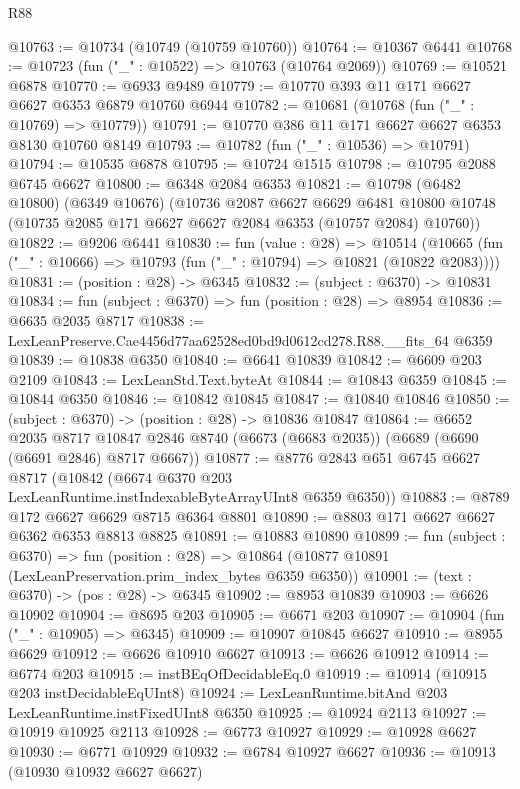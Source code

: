 \begin{lexlean}{R88}
\begin{coremodule}
@10763 := @10734 (@10749 (@10759 @10760))
@10764 := @10367 @6441
@10768 := @10723 (fun ("_" : @10522) => @10763 (@10764 @2069))
@10769 := @10521 @6878
@10770 := @6933 @9489
@10779 := @10770 @393 @11 @171 @6627 @6627 @6353 @6879 @10760 @6944
@10782 := @10681 (@10768 (fun ("_" : @10769) => @10779))
@10791 := @10770 @386 @11 @171 @6627 @6627 @6353 @8130 @10760 @8149
@10793 := @10782 (fun ("_" : @10536) => @10791)
@10794 := @10535 @6878
@10795 := @10724 @1515
@10798 := @10795 @2088 @6745 @6627
@10800 := @6348 @2084 @6353
@10821 := @10798
    (@6482 @10800)
    (@6349 @10676)
    (@10736
      @2087
      @6627
      @6629
      @6481
      @10800
      @10748
      (@10735 @2085 @171 @6627 @6627 @2084 @6353 (@10757 @2084) @10760))
@10822 := @9206 @6441
@10830 := fun (value : @28) =>
  @10514 (@10665 (fun ("_" : @10666) => @10793 (fun ("_" : @10794) => @10821 (@10822 @2083))))
@10831 := (position : @28) -> @6345
@10832 := (subject : @6370) -> @10831
@10834 := fun (subject : @6370) => fun (position : @28) => @8954
@10836 := @6635 @2035 @8717
@10838 := LexLeanPreserve.Cae4456d77aa62528ed0bd9d0612cd278.R88.__fits_64 @6359
@10839 := @10838 @6350
@10840 := @6641 @10839
@10842 := @6609 @203 @2109
@10843 := LexLeanStd.Text.byteAt
@10844 := @10843 @6359
@10845 := @10844 @6350
@10846 := @10842 @10845
@10847 := @10840 @10846
@10850 := (subject : @6370) -> (position : @28) -> @10836 @10847
@10864 := @6652
    @2035
    @8717
    @10847
    @2846
    @8740
    (@6673 (@6683 @2035))
    (@6689 (@6690 (@6691 @2846) @8717 @6667))
@10877 := @8776
    @2843
    @651
    @6745
    @6627
    @8717
    (@10842 (@6674 @6370 @203 LexLeanRuntime.instIndexableByteArrayUInt8 @6359 @6350))
@10883 := @8789 @172 @6627 @6629 @8715 @6364 @8801
@10890 := @8803 @171 @6627 @6627 @6362 @6353 @8813 @8825
@10891 := @10883 @10890
@10899 := fun (subject : @6370) =>
  fun (position : @28) => @10864 (@10877 @10891 (LexLeanPreservation.prim_index_bytes @6359 @6350))
@10901 := (text : @6370) -> (pos : @28) -> @6345
@10902 := @8953 @10839
@10903 := @6626 @10902
@10904 := @8695 @203
@10905 := @6671 @203
@10907 := @10904 (fun ("_" : @10905) => @6345)
@10909 := @10907 @10845 @6627
@10910 := @8955 @6629
@10912 := @6626 @10910 @6627
@10913 := @6626 @10912
@10914 := @6774 @203
@10915 := instBEqOfDecidableEq.{0}
@10919 := @10914 (@10915 @203 instDecidableEqUInt8)
@10924 := LexLeanRuntime.bitAnd @203 LexLeanRuntime.instFixedUInt8 @6350
@10925 := @10924 @2113
@10927 := @10919 @10925 @2113
@10928 := @6773 @10927
@10929 := @10928 @6627
@10930 := @6771 @10929
@10932 := @6784 @10927 @6627
@10936 := @10913 (@10930 @10932 @6627 @6627)

\end{coremodule}
\end{lexlean}
